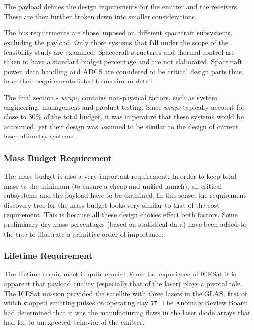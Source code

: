 The payload defines the design requirements for the emitter and the receivers. These are then further broken down into smaller considerations.

The bus requirements are those imposed on different spacecraft subsystems, excluding the payload. Only those systems that fall under the scope of the feasibility study are examined. Spacecraft structures and thermal control are taken to have a standard budget percentage and are not elaborated. Spacecraft power, data handling and \ac{ADCS} are considered to be critical design parts thus, have their requirements listed to maximum detail.

The final section - \emph{wraps}, contains non-physical factors, such as system engineering, management and product testing. Since \emph{wraps} typically account for close to 30\% of the total budget\cite{larson}, it was imperative that these systems would be accounted, yet their design was assumed to be similar to the design of current laser altimetry systems.

\subsubsection{Mass Budget Requirement}
\label{blMBR} 
The mass budget is also a very important requirement. In order to keep total mass to the minimum (to ensure a cheap and unified launch), all critical subsystems and the payload have to be examined. In this sense, the requirement discovery tree for the mass budget looks very similar to that of the cost requirement. This is because all these design choices effect both factors. Some preliminary dry mass percentages (based on statistical data\cite{larson}) have been added to the tree to illustrate a primitive order of importance.

\subsubsection{Lifetime Requirement}
\label{blLBR}
The lifetime requirement is quite crucial. From the experience of ICESat it is apparent that payload quality (especially that of the laser) plays a pivotal role. The ICESat mission provided the satellite with three lasers in the \ac{GLAS}, first of which stopped emitting pulses on operating day 37\cite{glasreview}. The Anomaly Review Board had determined that it was the manufacturing flaws in the laser diode arrays that had led to unexpected behavior of the emitter\cite{glasreview}.

